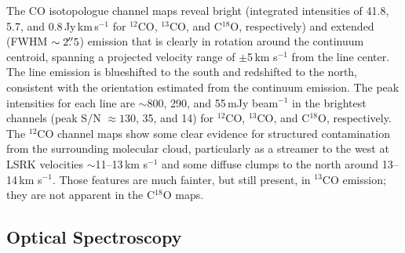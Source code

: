 \documentclass[twocolumn]{aastex61}
\begin{document}
The CO isotopologue channel maps reveal bright (integrated intensities of 41.8, 5.7, and 0.8\,Jy\,km\,s$^{-1}$ for $^{12}$CO, $^{13}$CO, and C$^{18}$O, respectively) and extended (FWHM $\sim 2\mbox{$.\!\!^{\prime\prime}$}5$) emission that is clearly in rotation around the continuum centroid, spanning a projected velocity range of $\pm$5\,km s$^{-1}$ from the line center.  The line emission is blueshifted to the south and redshifted to the north, consistent with the orientation estimated from the continuum emission.
The peak intensities for each line are $\sim$800, 290, and 55\,mJy beam$^{-1}$ in the brightest channels (peak S/N $\approx 130$, 35, and 14) for $^{12}$CO, $^{13}$CO, and C$^{18}$O, respectively.  The $^{12}$CO channel maps show some clear evidence for structured contamination from the surrounding molecular cloud, particularly as a streamer to the west at LSRK velocities $\sim$11--13\,km s$^{-1}$ and some diffuse clumps to the north around 13--14\,km s$^{-1}$.  Those features are much fainter, but still present, in $^{13}$CO emission; they are not apparent in the C$^{18}$O maps.



\subsection{Optical Spectroscopy \label{sec:spectroscopy}}
\end{document}
